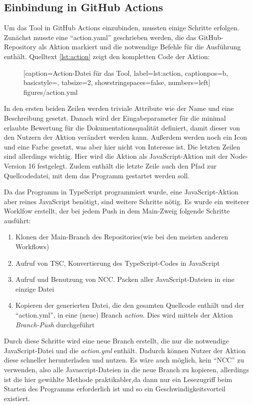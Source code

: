 \subsection{Einbindung in GitHub Actions}
Um das Tool in GitHub Actions einzubinden, mussten einige Schritte erfolgen. Zunächst musste eine \enquote{action.yaml} geschrieben werden, die das GitHub-Repository als Aktion markiert und die notwendige Befehle für die Ausführung enthält. Quelltext  \ref{lst:action} zeigt den kompletten Code der Aktion:
\begin{figure} [htbp]

[caption={Action-Datei für das Tool},
label={lst:action},
captionpos=b, basicstyle=\footnotesize, tabsize=2, showstringspaces=false,  numbers=left]
{figures/action.yml}
\end{figure}

In den ersten beiden Zeilen werden triviale Attribute wie der Name und eine Beschreibung gesetzt. Danach wird der Eingabeparameter für die minimal erlaubte Bewertung für die Dokumentationsqualität definiert, damit dieser von den Nutzern der Aktion verändert werden kann.  Außerdem werden noch ein Icon und eine Farbe gesetzt, was aber hier nicht von Interesse ist. Die letzten Zeilen sind allerdings wichtig. Hier wird die Aktion als JavaScript-Aktion mit der Node-Version 16 festgelegt. Zudem enthält die letzte Zeile auch den Pfad zur Quellcodedatei, mit dem das Programm gestartet werden soll. 

Da das Programm in TypeScript programmiert wurde, eine JavaScript-Aktion aber reines JavaScript benötigt, sind weitere Schritte nötig. Es wurde ein weiterer Worklfow erstellt, der bei jedem Push in dem Main-Zweig folgende Schritte ausführt:
\begin{enumerate}
    \item Klonen der Main-Branch des Repositories(wie bei den meisten anderen Workflows)
    \item Aufruf von TSC, Konvertierung des TypeScript-Codes in JavaScript
    \item Aufruf und Benutzung von NCC\cite{ncc}. Packen aller JavaScript-Dateien in eine einzige Datei
    \item Kopieren der generierten Datei, die den gesamten Quellcode enthält und der \enquote{action.yml}, in eine (neue) Branch \textit{action}. Dies wird mittels der Aktion \textit{Branch-Push}\cite{Branch-Push} durchgeführt
\end{enumerate}
Durch diese Schritte wird eine neue Branch erstellt, die nur die notwendige JavaScript-Datei und die \textit{action.yml} enthält. Dadurch können Nutzer der Aktion diese schneller herunterladen und nutzen. Es wäre auch möglich, kein \enquote{NCC} zu verwenden, also alle Javascript-Dateien in die neue Branch zu kopieren, allerdings ist die hier gewählte Methode praktikabler,da dann nur ein Lesezugriff beim Starten des Programms erforderlich ist und so ein Geschwindigkeitsvorteil existiert. 

